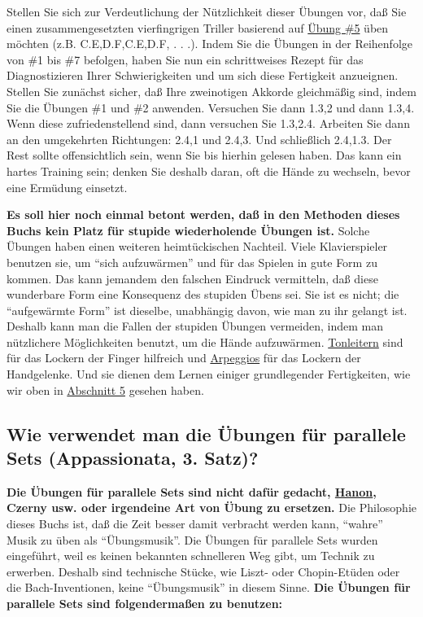 Stellen Sie sich zur Verdeutlichung der Nützlichkeit dieser Übungen vor, daß Sie einen zusammengesetzten vierfingrigen Triller basierend auf \hyperlink{c1iii7b5}{Übung \#5} üben möchten (z.B. C.E,D.F,C.E,D.F, . . .).
Indem Sie die Übungen in der Reihenfolge von \#1 bis \#7 befolgen, haben Sie nun ein schrittweises Rezept für das Diagnostizieren Ihrer Schwierigkeiten und um sich diese Fertigkeit anzueignen.
Stellen Sie zunächst sicher, daß Ihre zweinotigen Akkorde gleichmäßig sind, indem Sie die Übungen \#1 und \#2 anwenden.
Versuchen Sie dann 1.3,2 und dann 1.3,4.
Wenn diese zufriedenstellend sind, dann versuchen Sie 1.3,2.4.
Arbeiten Sie dann an den umgekehrten Richtungen: 2.4,1 und 2.4,3. Und schließlich 2.4,1.3.
Der Rest sollte offensichtlich sein, wenn Sie bis hierhin gelesen haben.
Das kann ein hartes Training sein; denken Sie deshalb daran, oft die Hände zu wechseln, bevor eine Ermüdung einsetzt.

\textbf{Es soll hier noch einmal betont werden, daß in den Methoden dieses Buchs kein Platz für stupide wiederholende Übungen ist.}
Solche Übungen haben einen weiteren heimtückischen Nachteil.
Viele Klavierspieler benutzen sie, um \enquote{sich aufzuwärmen} und für das Spielen in gute Form zu kommen.
Das kann jemandem den falschen Eindruck vermitteln, daß diese wunderbare Form eine Konsequenz des stupiden Übens sei.
Sie ist es nicht; die \enquote{aufgewärmte Form} ist dieselbe, unabhängig davon, wie man zu ihr gelangt ist.
Deshalb kann man die Fallen der stupiden Übungen vermeiden, indem man nützlichere Möglichkeiten benutzt, um die Hände aufzuwärmen.
\hyperlink{c1iii5a}{Tonleitern} sind für das Lockern der Finger hilfreich und \hyperlink{c1iii5e}{Arpeggios} für das Lockern der Handgelenke.
Und sie dienen dem Lernen einiger grundlegender Fertigkeiten, wie wir oben in \hyperlink{c1iii5}{Abschnitt 5} gesehen haben.


\subsection{Wie verwendet man die Übungen für parallele Sets (Appassionata, 3. Satz)?}\hypertarget{c1iii7c}{}

\textbf{Die Übungen für parallele Sets sind nicht dafür gedacht, \hyperlink{c1iii7h}{Hanon}, Czerny usw. oder irgendeine Art von Übung zu ersetzen.}
Die Philosophie dieses Buchs ist, daß die Zeit besser damit verbracht werden kann, \enquote{wahre} Musik zu üben als \enquote{Übungsmusik}.
Die Übungen für parallele Sets wurden eingeführt, weil es keinen bekannten schnelleren Weg gibt, um Technik zu erwerben.
Deshalb sind technische Stücke, wie Liszt- oder Chopin-Etüden oder die Bach-Inventionen, keine \enquote{Übungsmusik} in diesem Sinne.
\textbf{Die Übungen für parallele Sets sind folgendermaßen zu benutzen:}


